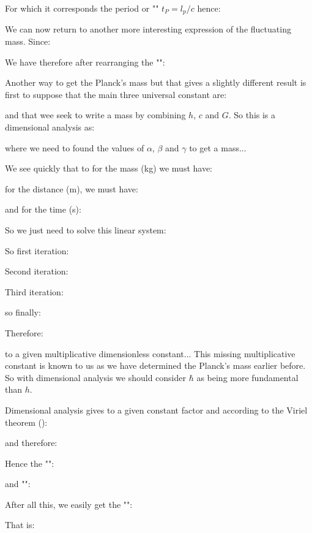 	For which it corresponds the period or "" $t_P=l_p/c$ hence:
	
	We can now return to another more interesting expression of the fluctuating mass. Since:
	
	We have therefore after rearranging the "":
	
	Another way to get the Planck's mass but that gives a slightly different result is first to suppose that the main three universal constant are:
	
	and that wee seek to write a mass by combining $h$, $c$ and $G$. So this is a dimensional analysis as:
	
	where we need to found the values of $\alpha$, $\beta$ and $\gamma$ to get a mass...
	
	We see quickly that to for the mass (kg) we must have:
	
	for the distance (m), we must have:
	
	and for the time (s):
	
	So we just need to solve this linear system:
	
	So first iteration:
	
	Second iteration:
	
	Third iteration:
	
	so finally:
	
	Therefore:
	
	to a given multiplicative dimensionless constant... This missing multiplicative constant is known to us as we have determined the Planck's mass earlier before. So with dimensional analysis we should consider $\hbar$ as being more fundamental than $h$.
	
	Dimensional analysis gives to a given constant factor and according to the Viriel theorem ():
	
	and therefore:
	
	Hence the "":
	
	and "":
	
	After all this, we easily get the "":
	
	That is:
	
